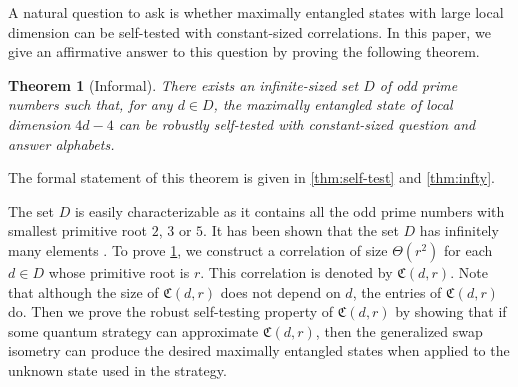 \documentclass[11pt,letterpaper]{article}
\newcommand{\1}{\mathbb{1}}
\newcommand{\fC}{\mathfrak{C}}
\newtheorem{theorem}{Theorem}[section]
\theoremstyle{definition}
\begin{document}
A natural question to ask is whether maximally entangled states with large local dimension
can be self-tested with constant-sized correlations. 
In this paper, we give an affirmative answer to this question by proving the following theorem.
\begin{theorem}[Informal]
\label{thm:inf}
	There exists an infinite-sized set $D$ of odd prime numbers such that, for any $d \in D$, 
	the maximally entangled state of local dimension $4d-4$ can be robustly self-tested 
	with constant-sized question and answer alphabets.
\end{theorem}
The formal statement of this theorem is given in \cref{thm:self-test} and \cref{thm:infty}.

The set $D$ is easily characterizable as it contains all the odd prime numbers with smallest
primitive root $2$, $3$ or $5$. It has been shown that  the set $D$ has infinitely many elements \cite{murty1988}.
To prove \cref{thm:inf}, we construct a correlation of size $\Theta(r^2)$ for each $d \in D$ whose primitive
root is $r$. This correlation is denoted by $\fC(d,r)$.
Note that although the size of $\fC(d,r)$ does not depend on $d$, the entries of $\fC(d,r)$ do.
Then we prove the robust self-testing property of $\fC(d,r)$ by showing 
that if some quantum strategy can approximate $\fC(d,r)$, then
the generalized swap isometry \cite{yang2013}
can produce the desired maximally entangled states when applied to the unknown state used in the strategy.
\end{document}
